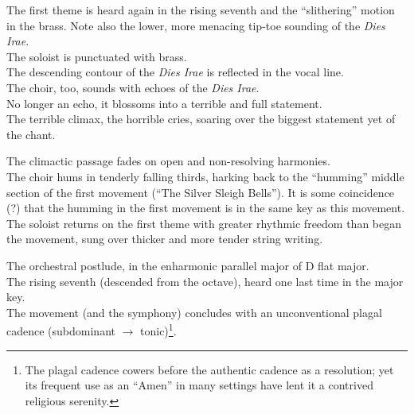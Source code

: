 \documentclass{beamer}
\begin{document}
\begin{frame}
  The first theme is heard again in the rising seventh and the ``slithering'' motion in the brass. Note also the lower, more menacing tip-toe sounding of the \textit{Dies Irae}. 
  \pause \\ 
  The soloist is punctuated with brass. 
  \pause \\ 
  The descending contour of the \textit{Dies Irae} is reflected in the vocal line. 
  \pause \\ 
  The choir, too, sounds with echoes of the \textit{Dies Irae}. 
  \pause \\
  No longer an echo, it blossoms into a terrible and full statement. 
  \pause \\ 
  The terrible climax, the horrible cries, soaring over the biggest statement yet of the chant. 
\end{frame} 

\begin{frame}
  The climactic passage fades on open and non-resolving harmonies. 
  \pause \\
  The choir hums in tenderly falling thirds, harking back to the ``humming'' middle section of the first movement (``The Silver Sleigh Bells''). It is some coincidence (?) that the humming in the first movement is in the same key as this movement. 
  \pause \\
  The soloist returns on the first theme with greater rhythmic freedom than began the movement, sung over thicker and more tender string writing. 
\end{frame} 

\begin{frame}
  The orchestral postlude, in the enharmonic parallel major of D flat major. 
  \pause \\
  The rising seventh (descended from the octave), heard one last time in the major key. 
  \pause \\
  The movement (and the symphony) concludes with an unconventional plagal cadence (subdominant \(\to\) tonic)\footnote{The plagal cadence cowers before the authentic cadence as a resolution; yet its frequent use as an ``Amen'' in many settings have lent it a contrived religious serenity.}. 
\end{frame} 
\end{document}
